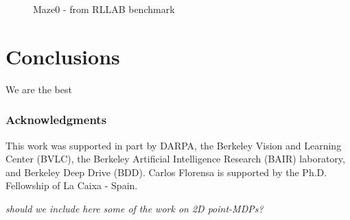\documentclass{article} %
\begin{document}
\begin{figure}[h!]
	\centering
	\caption{Maze0 - from RLLAB benchmark}
	\label{fig:hierarchized-exploration}
\end{figure}

\section{Conclusions}
We are the best

\subsubsection*{Acknowledgments}
This work was supported in part by DARPA, the Berkeley Vision and Learning Center (BVLC), the Berkeley Artificial Intelligence Research (BAIR) laboratory, and Berkeley Deep Drive (BDD). Carlos Florensa is supported by the Ph.D. Fellowship of La Caixa - Spain.

\textit{should we include here some of the work on 2D point-MDPs?}


\end{document}
